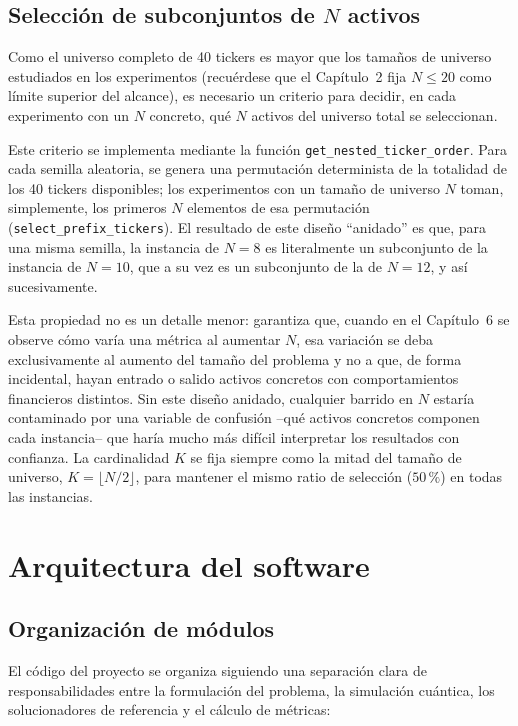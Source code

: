 \subsection{Selección de subconjuntos de $N$ activos}

Como el universo completo de 40 tickers es mayor que los tamaños de universo estudiados en los experimentos (recuérdese que el Capítulo~2 fija $N \leq 20$ como límite superior del alcance), es necesario un criterio para decidir, en cada experimento con un $N$ concreto, qué $N$ activos del universo total se seleccionan.

Este criterio se implementa mediante la función \texttt{get\_nested\_ticker\_order}. Para cada semilla aleatoria, se genera una permutación determinista de la totalidad de los 40 tickers disponibles; los experimentos con un tamaño de universo $N$ toman, simplemente, los primeros $N$ elementos de esa permutación (\texttt{select\_prefix\_tickers}). El resultado de este diseño ``anidado'' es que, para una misma semilla, la instancia de $N=8$ es literalmente un subconjunto de la instancia de $N=10$, que a su vez es un subconjunto de la de $N=12$, y así sucesivamente.

Esta propiedad no es un detalle menor: garantiza que, cuando en el Capítulo~6 se observe cómo varía una métrica al aumentar $N$, esa variación se deba exclusivamente al aumento del tamaño del problema y no a que, de forma incidental, hayan entrado o salido activos concretos con comportamientos financieros distintos. Sin este diseño anidado, cualquier barrido en $N$ estaría contaminado por una variable de confusión --qué activos concretos componen cada instancia-- que haría mucho más difícil interpretar los resultados con confianza. La cardinalidad $K$ se fija siempre como la mitad del tamaño de universo, $K = \lfloor N/2 \rfloor$, para mantener el mismo ratio de selección ($50\,\%$) en todas las instancias.

\section{Arquitectura del software}
\label{sec:arquitectura}

\subsection{Organización de módulos}

El código del proyecto se organiza siguiendo una separación clara de responsabilidades entre la formulación del problema, la simulación cuántica, los solucionadores de referencia y el cálculo de métricas:

